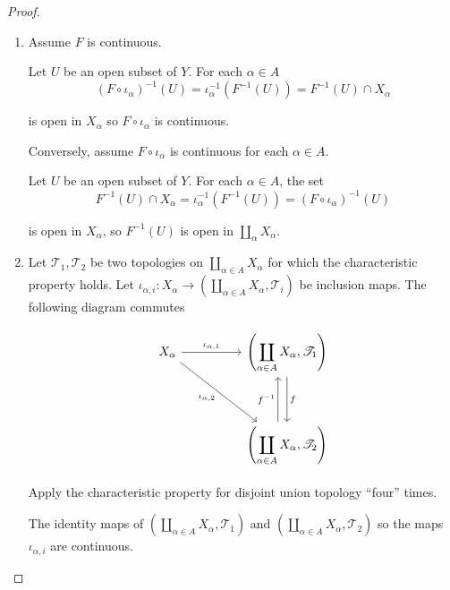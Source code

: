 \begin{proof}
    \begin{enumerate}[itemsep=0pt,label={(\alph*)}]
        \item Assume \( F \) is continuous.

              Let \( U \) be an open subset of \( Y \). For each \( \alpha \in A \)
              \[
                  {(F \circ \iota_{\alpha})}^{-1}(U) = \iota_{\alpha}^{-1}(F^{-1}(U)) = F^{-1}(U) \cap X_{\alpha}
              \]

              is open in \( X_{\alpha} \) so \( F \circ \iota_{\alpha} \) is continuous.

              Conversely, assume \( F \circ \iota_{\alpha} \) is continuous for each \( \alpha \in A \).

              Let \( U \) be an open subset of \( Y \). For each \( \alpha \in A \), the set
              \[
                  F^{-1}(U) \cap X_{\alpha} = \iota_{\alpha}^{-1}(F^{-1}(U)) = {(F \circ \iota_{\alpha})}^{-1}(U)
              \]

              is open in \( X_{\alpha} \), so \( F^{-1}(U) \) is open in \( \coprod_{\alpha} X_{\alpha} \).
        \item Let \( \mathscr{T}_{1}, \mathscr{T}_{2} \) be two topologies on \( \coprod_{\alpha\in A} X_{\alpha} \) for which the characteristic property holds. Let \( \iota_{\alpha,i}: X_{\alpha} \to \left(\coprod_{\alpha\in A} X_{\alpha}, \mathscr{T}_{i}\right) \) be inclusion maps. The following diagram commutes

              \[
                  \begin{tikzcd}
                      {X_{\alpha}} && {\left(\displaystyle\coprod_{\alpha\in A} X_{\alpha}, \mathscr{T}_{1}\right)} \\
                      \\
                      && {\left(\displaystyle\coprod_{\alpha\in A} X_{\alpha}, \mathscr{T}_{2}\right)}
                      \arrow["{\iota_{\alpha,1}}", from=1-1, to=1-3]
                      \arrow["{\iota_{\alpha,2}}"', from=1-1, to=3-3]
                      \arrow["f", from=1-3, to=3-3]
                      \arrow["{f^{-1}}", shift left=3, from=3-3, to=1-3]
                  \end{tikzcd}
              \]

              Apply the characteristic property for disjoint union topology ``four'' times.

              The identity maps of \( \left(\displaystyle\coprod_{\alpha\in A} X_{\alpha}, \mathscr{T}_{1}\right) \) and \( \left(\displaystyle\coprod_{\alpha\in A} X_{\alpha}, \mathscr{T}_{2}\right) \) so the maps \( \iota_{\alpha,i} \) are continuous.


\end{enumerate}
\end{proof}
